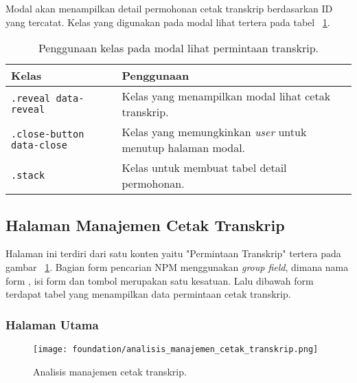 \noindent Modal akan menampilkan detail permohonan cetak transkrip berdasarkan ID yang tercatat. Kelas yang digunakan pada modal lihat tertera pada tabel ~\ref{table:analisisModalLihatPermintaanCetakTranskrip}. \\

\begin{table}[H]
	\centering
	\caption{Penggunaan kelas pada modal lihat permintaan transkrip.}
	\begin{tabularx}{\textwidth}{lX}
		\toprule
		Kelas & Penggunaan \\
		\midrule
		\texttt{.reveal data-reveal} & Kelas yang menampilkan modal lihat cetak transkrip. \\
		\texttt{.close-button data-close} & Kelas yang memungkinkan \textit{user} untuk menutup halaman modal.\\
		\texttt{.stack} & Kelas untuk membuat tabel detail permohonan.\\
		\bottomrule
	\end{tabularx}%
	\label{table:analisisModalLihatPermintaanCetakTranskrip}
\end{table}%

\subsection{Halaman Manajemen Cetak Transkrip}
Halaman ini terdiri dari satu konten yaitu "Permintaan Transkrip" tertera pada gambar ~\ref{fig:analisisManajemenCetakTranskrip}. Bagian form pencarian NPM menggunakan \textit{group field}, dimana nama form , isi form dan tombol merupakan satu kesatuan. Lalu dibawah form terdapat tabel yang menampilkan data permintaan cetak transkrip. 
\subsubsection{Halaman Utama}
\begin{figure} [H]
	\centering  
	\texttt{[image: foundation/analisis\_manajemen\_cetak\_transkrip.png]}
	\caption{Analisis manajemen cetak transkrip.} 
	\label{fig:analisisManajemenCetakTranskrip}
\end{figure} 

